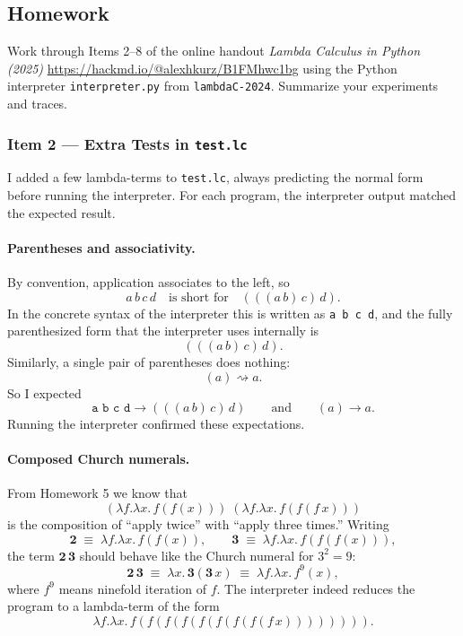 \documentclass{article}
\theoremstyle{theorem}
\theoremstyle{definition}
\theoremstyle{remark}
\begin{document}
\subsection*{Homework}
Work through Items 2--8 of the online handout \emph{Lambda Calculus in Python (2025)} \url{https://hackmd.io/@alexhkurz/B1FMhwc1bg} using the Python interpreter \texttt{interpreter.py} from \texttt{lambdaC-2024}. Summarize your experiments and traces.

\subsubsection*{Item 2 --- Extra Tests in \texttt{test.lc}}
I added a few lambda-terms to \texttt{test.lc}, always predicting the normal form before running the interpreter. For each program, the interpreter output matched the expected result.

\paragraph{Parentheses and associativity.}
By convention, application associates to the left, so
\[
a\,b\,c\,d \quad\text{is short for}\quad (((a\,b)\,c)\,d).
\]
In the concrete syntax of the interpreter this is written as \texttt{a b c d}, and the fully parenthesized form that the interpreter uses internally is
\[
(((a\,b)\,c)\,d).
\]
Similarly, a single pair of parentheses does nothing:
\[
(a) \rightsquigarrow a.
\]
So I expected
\[
\texttt{a b c d} \to (((a\,b)\,c)\,d) \qquad\text{and}\qquad (a) \to a.
\]
Running the interpreter confirmed these expectations.

\paragraph{Composed Church numerals.}
From Homework 5 we know that
\[
(\lambda f.\lambda x.\,f(f(x)))\;(\lambda f.\lambda x.\,f(f(f\,x)))
\]
is the composition of ``apply twice'' with ``apply three times.'' Writing
\[
\mathbf{2} \;\equiv\; \lambda f.\lambda x.\, f(f(x)), \qquad
\mathbf{3} \;\equiv\; \lambda f.\lambda x.\, f(f(f(x))),
\]
the term \(\mathbf{2}\,\mathbf{3}\) should behave like the Church numeral for \(3^2=9\):
\[
\mathbf{2}\,\mathbf{3}\;\equiv\;\lambda x.\,\mathbf{3}(\mathbf{3}\,x)
\;\equiv\; \lambda f.\lambda x.\, f^{9}(x),
\]
where \(f^{9}\) means ninefold iteration of \(f\). The interpreter indeed reduces the program to a lambda-term of the form
\[
\lambda f.\lambda x.\, f(f(f(f(f(f(f(f(f\,x)))))))).
\]
\end{document}
